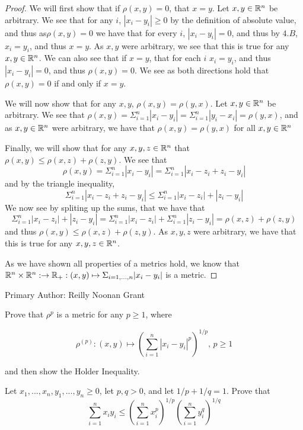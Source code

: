 \begin{proof}
  We will first show that if $\rho(x,y)=0$, that $x=y$. Let $x,y\in
  \mathbb{R}^n$ be arbitrary. We see that
  for any $i$, $|x_i-y_i|\geq 0$ by the definition of absolute value,
  and thus as$\rho(x,y) =0$ we have that for every $i$,
  $|x_i-y_i|=0$, and thus by $4.B$, $x_i=y_i$, and thus $x=y$. As
  $x,y$ were arbitrary, we see that this is true for any $x,y \in
  \mathbb{R}^n$. We can also see that if $x=y$, that for each $i$ $x_i=y_i$,
  and thus $|x_i-y_i| = 0$, and thus $\rho(x,y)=0$. We see as both
  directions hold that $\rho(x,y)=0$ if and only if $x=y$.

  We will now show that for any $x,y$, $\rho(x,y)=\rho(y,x)$. Let
  $x,y\in \mathbb{R}^n$ be arbitrary. We see that $\rho(x,y)= \Sigma_{i=1}^n
  |x_i-y_i| = \Sigma_{i=1}^n |y_i - x_i|= \rho(y,x)$, and as $x,y \in
  \mathbb{R}^n$ were arbitrary, we have that $\rho(x,y)=\rho(y,x)$ for all
  $x,y\in \mathbb{R}^n$

  Finally, we will show that for any $x,y,z \in \mathbb{R}^n$ that 
  $\rho(x,y) \leq \rho(x,z) + \rho(z,y)$. We see that 
  $$\rho(x,y) = \Sigma_{i=1}^n |x_i-y_i|=\Sigma_{i=1}^n
  |x_i-z_i+z_i-y_i| $$
  and by the triangle inequality, 
    $$\Sigma_{i=1}^n |x_i-z_i+z_i-y_i| \leq  \Sigma_{i=1}^n
    |x_i-z_i|+|z_i-y_i|$$
    We now see by spliting up the sums, that we have that 
    $$\Sigma_{i=1}^n  |x_i-z_i|+|z_i-y_i| = \Sigma_{i=1}^n |x_i-z_i|
    +\Sigma_{i=1}^n |z_i-y_i|=\rho(x,z)+\rho(z,y)$$
    and thus $\rho(x,y) \leq \rho(x,z)+\rho(z,y)$. As $x,y,z$ were
    arbitrary, we have that this is true for any $x,y,z \in \mathbb{R}^n$.

    As we have shown all properties of a metrics hold, we know that 
    $\mathbb{R}^n \times \mathbb{R}^n :\rightarrow \mathbb{R}_+: (x,y) \mapsto
  \Sigma_{i=1,...,n} |x_i- y_i|$ is a metric.
\end{proof}

Primary Author: Reilly Noonan Grant


\begin{minorEx}%
  Prove that $\rho^{p}$ is a metric for any $p \geq 1$, where

$$\rho^{(p)} : (x,y) \mapsto (\sum_{i=1}^n |x_i - y_i|^p)^{1/p} \text{,   }p\geq 1$$

and then show the Holder Inequality. 

Let $x_1,...,x_n,y_1,...,y_n \geq 0$, let $p,q >0$,
and let $1/p + 1/q =1$. Prove that
$$\sum_{i=1}^n x_iy_i \leq (\sum_{i=1}^n x_i^p)^{1/p} (\sum_{i=1}^ny_i^q)^{1/q}$$
\end{minorEx}

